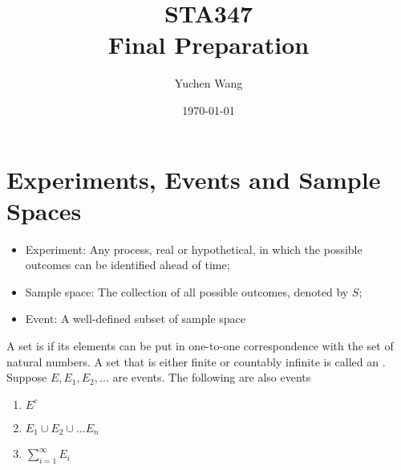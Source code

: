 \documentclass[11pt]{article}
\title{STA347 \\ Final Preparation}
\author{Yuchen Wang}
\date{\today}
\begin{document}
    \maketitle
    \tableofcontents
    \newpage
    \section{Experiments, Events and Sample Spaces}
    \begin{itemize}
    	\item Experiment: Any process, real or hypothetical, in which the possible outcomes can be identified ahead of time;
    	\item Sample space: The collection of all possible outcomes, denoted by $S$;
    	\item Event: A well-defined subset of sample space
    \end{itemize}
   A set is  if its elements can be put in one-to-one correspondence with the set of natural numbers.
   A set that is either finite or countably infinite is called an .
   \theorem
   Suppose $E, E_1, E_2, \hdots$ are events. The following are also events
   \begin{enumerate}
   	\item $E^c$
   	\item $E_1 \cup E_2 \cup \hdots E_n$
   	\item $\sum_{i=1}^\infty E_i$
   \end{enumerate}
\end{document}

